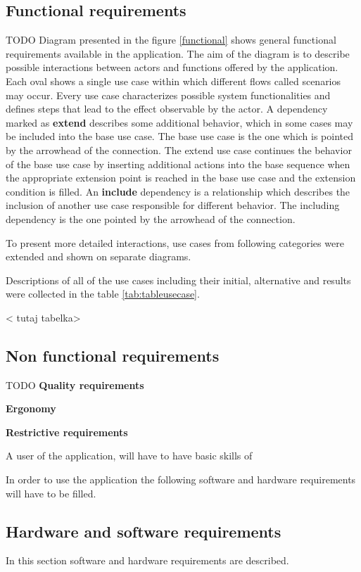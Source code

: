 \subsection{Functional requirements}
TODO
Diagram presented in the figure \ref{functional} shows general functional requirements available in the application. The aim of the diagram is to describe possible interactions between actors and functions offered by the application. Each oval shows a single use case within which different flows called scenarios may occur. Every use case characterizes possible system functionalities and defines steps that lead to the effect observable by the actor. A dependency marked as \textbf{extend} describes some additional behavior, which in some cases may be included into the base use case. 
The base use case is the one which is pointed by the arrowhead of the connection. The extend use case continues the behavior of the base use case by inserting additional actions into the base sequence when the appropriate extension point is reached in the base use case and the extension condition is filled. An \textbf{include} dependency is a relationship which describes the inclusion of another use case responsible for different behavior. The including dependency is the one pointed by the arrowhead of the connection.


To present more detailed interactions, use cases from following categories were extended and shown on separate diagrams.

 
Descriptions of all of the use cases including their initial, alternative and results were collected in the table \ref{tab:tableusecase}.
\vspace{5em}

< tutaj tabelka>
    
\subsection{Non functional requirements}
TODO
\textbf{Quality requirements}


\textbf{Ergonomy}
\label{interfaceerg}


\textbf{Restrictive requirements}

A user of the application, will have to have basic skills of 


In order to use the application the following software and hardware requirements will have to be filled.

\subsection{Hardware and software requirements}
In this section software and hardware requirements are described.

